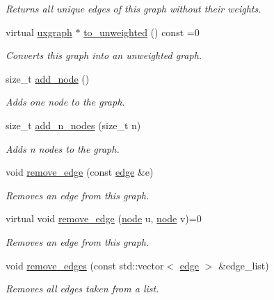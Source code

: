 \begin{DoxyCompactItemize}
\begin{DoxyCompactList}\small\item\em Returns all unique edges of this graph without their weights. \end{DoxyCompactList}\item 
virtual \hyperlink{classlgraph_1_1uxgraph}{uxgraph} $\ast$ \hyperlink{classlgraph_1_1wxgraph_a7fcd56f02a50591ba3ce5e5c7792b4aa}{to\-\_\-unweighted} () const =0
\begin{DoxyCompactList}\small\item\em Converts this graph into an unweighted graph. \end{DoxyCompactList}\item 
size\-\_\-t \hyperlink{classlgraph_1_1xxgraph_a6cb21d5e52afbb438a3e6643998c40cf}{add\-\_\-node} ()
\begin{DoxyCompactList}\small\item\em Adds one node to the graph. \end{DoxyCompactList}\item 
size\-\_\-t \hyperlink{classlgraph_1_1xxgraph_a8dd24aa48d55dfceaa87e47c32ae914a}{add\-\_\-n\-\_\-nodes} (size\-\_\-t n)
\begin{DoxyCompactList}\small\item\em Adds {\itshape n} nodes to the graph. \end{DoxyCompactList}\item 
void \hyperlink{classlgraph_1_1xxgraph_a46a75fa2a10a8674ab930e9dc766e2f9}{remove\-\_\-edge} (const \hyperlink{namespacelgraph_a76bd7d50719f03de7a85db259d80d572}{edge} \&e)
\begin{DoxyCompactList}\small\item\em Removes an edge from this graph. \end{DoxyCompactList}\item 
virtual void \hyperlink{classlgraph_1_1xxgraph_a7fd3a1309cde4f408c8d9d4cb3b898a8}{remove\-\_\-edge} (\hyperlink{namespacelgraph_a397169dd66adf725210a30fb7251773e}{node} u, \hyperlink{namespacelgraph_a397169dd66adf725210a30fb7251773e}{node} v)=0
\begin{DoxyCompactList}\small\item\em Removes an edge from this graph. \end{DoxyCompactList}\item 
void \hyperlink{classlgraph_1_1xxgraph_aef7c4bf62f3f4db362b2d3accb3b6d3d}{remove\-\_\-edges} (const std\-::vector$<$ \hyperlink{namespacelgraph_a76bd7d50719f03de7a85db259d80d572}{edge} $>$ \&edge\-\_\-list)
\begin{DoxyCompactList}\small\item\em Removes all edges taken from a list. \end{DoxyCompactList}\item 

\end{DoxyCompactItemize}

